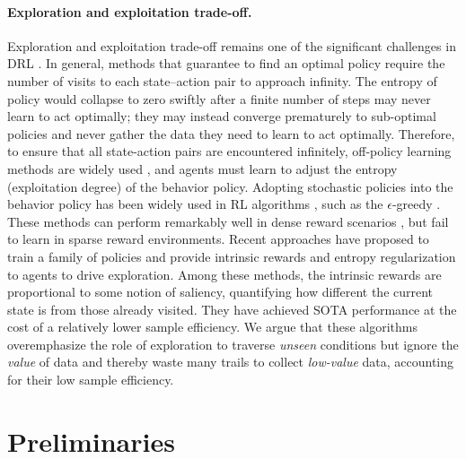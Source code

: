 \paragraph{Exploration and exploitation trade-off. } Exploration and exploitation trade-off remains one of the significant  challenges in DRL \citep{ngu,sutton}.  In general, methods that guarantee to find an optimal policy require the number of visits to each state–action pair to approach infinity. The entropy of policy would collapse
to zero swiftly after a finite number of steps may never learn to act optimally; they may instead converge prematurely to sub-optimal policies and never gather the data they need to learn to act optimally. Therefore, to ensure that all state-action pairs are encountered infinitely, off-policy learning methods are widely used \citep{a3c,impala}, and agents must learn to adjust the entropy (exploitation degree) of the behavior policy. Adopting stochastic policies into the behavior policy has been widely used in RL algorithms \citep{dqn,rainbow}, such as the $\epsilon$-greedy \citep{epsilongreedy}. These methods  can perform remarkably well in dense reward scenarios \citep{dqn}, but fail to learn in  sparse reward environments. Recent approaches \citep{agent57} have proposed to train a family of policies and provide  intrinsic rewards and entropy regularization to agents to drive exploration. Among these methods, the intrinsic rewards  are proportional to some notion of saliency, quantifying how different the current state is from those already visited.  They have achieved SOTA performance at the cost of a relatively lower sample efficiency.  We argue that these algorithms overemphasize the role of exploration to traverse \emph{unseen} conditions but ignore the \emph{value} of data and thereby waste many trails to collect \emph{low-value} data, accounting for their low sample efficiency.
\section{Preliminaries}

